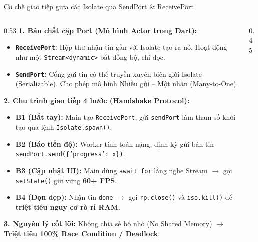 \documentclass[aspectratio=169, 10pt]{beamer}
\begin{document}
\begin{frame}{Cơ chế giao tiếp giữa các Isolate qua SendPort \& ReceivePort}
  \vspace{-0.15cm}
  \begin{columns}[c]
    \begin{column}{0.53\textwidth}
      \footnotesize
      \textbf{1. Bản chất cặp Port (Mô hình Actor trong Dart):}
      \begin{itemize}
        \setlength{\itemsep}{1.5pt}
        \item \textbf{\texttt{ReceivePort}:} Hộp thư nhận tin gắn với Isolate tạo ra nó. Hoạt động như một \texttt{Stream<dynamic>} bất đồng bộ, chỉ đọc.
        \item \textbf{\texttt{SendPort}:} Cổng gửi tin có thể truyền xuyên biên giới Isolate (Serializable). Cho phép mô hình Nhiều gửi -- Một nhận (Many-to-One).
      \end{itemize}
      \vspace{0.1cm}
      \textbf{2. Chu trình giao tiếp 4 bước (Handshake Protocol):}
      \begin{itemize}
        \setlength{\itemsep}{1.5pt}
        \item \textbf{B1 (Bắt tay):} Main tạo \texttt{ReceivePort}, gửi \texttt{sendPort} làm tham số khởi tạo qua lệnh \texttt{Isolate.spawn()}.
        \item \textbf{B2 (Báo tiến độ):} Worker tính toán nặng, định kỳ gửi bản tin \texttt{sendPort.send(\{'progress': x\})}.
        \item \textbf{B3 (Cập nhật UI):} Main dùng \texttt{await for} lắng nghe Stream $\rightarrow$ gọi \texttt{setState()} giữ vững \textbf{60+ FPS}.
        \item \textbf{B4 (Dọn dẹp):} Nhận tin \texttt{done} $\rightarrow$ gọi \texttt{rp.close()} và \texttt{iso.kill()} để \textbf{triệt tiêu nguy cơ rò rỉ RAM}.
      \end{itemize}
      \vspace{0.1cm}
      \textbf{3. Nguyên lý cốt lõi:} Không chia sẻ bộ nhớ (No Shared Memory) $\rightarrow$ \textbf{Triệt tiêu 100\% Race Condition / Deadlock}.
    \end{column}

    \begin{column}{0.45\textwidth}
      \centering
\end{column}
\end{columns}
\end{frame}
\end{document}
